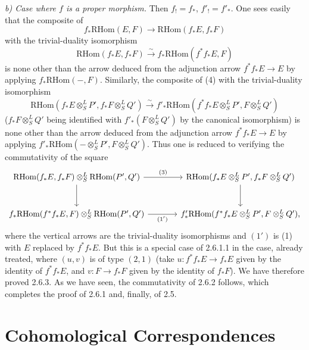 \documentclass[11pt]{article}
\providecommand{\RHom}{\mathrm{RHom}}
\begin{document}
\emph{b) Case where $f$ is a proper morphism.} Then $f_!=f_*$, $f'_!=f'_*$. One sees easily that the composite of
\[
f_*\RHom(E,F)\longrightarrow\RHom(f_*E,f_*F)
\]
with the trivial-duality isomorphism
\[
\RHom(f_*E,f_*F)\xrightarrow{\sim}f_*\RHom(f^{*}f_*E,F)
\]
is none other than the arrow deduced from the adjunction arrow $f^{*}f_*E\to E$ by applying $f_*\RHom(-,F)$. Similarly, the composite of (4) with the trivial-duality isomorphism
\[
\RHom(f_*E\otimes^L_SP',f_*F\otimes^L_SQ')\xrightarrow{\sim}f'_*\RHom(f^{*}f_*E\otimes^L_SP',F\otimes^L_SQ')
\]
($f_*F\otimes^L_SQ'$ being identified with $f'_*(F\otimes^L_SQ')$ by the canonical isomorphism) is none other than the arrow deduced from the adjunction arrow $f^{*}f_*E\to E$ by applying $f'_*\RHom(-\otimes^L_SP',F\otimes^L_SQ')$. Thus one is reduced to verifying the commutativity of the square
\[
\begin{tikzcd}[column sep=large,row sep=large]
\RHom(f_*E,f_*F)\otimes^L_S\RHom(P',Q') \arrow[r,"(3)"] \arrow[d] & \RHom(f_*E\otimes^L_SP',f_*F\otimes^L_SQ') \arrow[d]\\
f_*\RHom(f^{*}f_*E,F)\otimes^L_S\RHom(P',Q') \arrow[r,"(1')"'] & f'_*\RHom(f^{*}f_*E\otimes^L_SP',F\otimes^L_SQ'),
\end{tikzcd}
\]
where the vertical arrows are the trivial-duality isomorphisms and $(1')$ is (1) with $E$ replaced by $f^{*}f_*E$. But this is a special case of 2.6.1.1 in the case, already treated, where $(u,v)$ is of type $(2,1)$ (take $u:f^{*}f_*E\to f_*E$ given by the identity of $f^{*}f_*E$, and $v:F\to f_*F$ given by the identity of $f_*F$). We have therefore proved 2.6.3. As we have seen, the commutativity of 2.6.2 follows, which completes the proof of 2.6.1 and, finally, of 2.5.

\clearpage
\section{Cohomological Correspondences}
\end{document}
